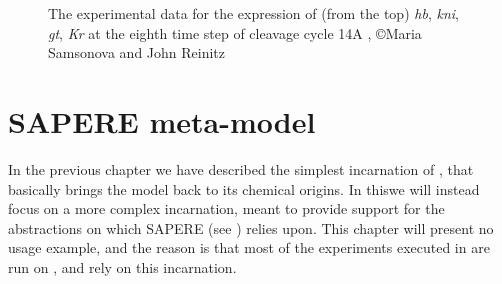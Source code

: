 \documentclass[12pt,a4paper,twoside,openright]{book}
\begin{document}
\begin{figure}
\caption[Drosophila experimental data]{The experimental data for the expression of (from the top) \emph{hb}, \emph{kni}, \emph{gt}, \emph{Kr} at the eighth time step of cleavage cycle 14A  \cite{database-2008}, \copyright Maria Samsonova and John Reinitz}
\label{fig:expdata}
\end{figure}


\chapter{SAPERE meta-model}

In the previous chapter we have described the simplest incarnation of \alchemist{}, that basically brings the model back to its chemical origins.
%
In this\levelText{}we will instead focus on a more complex incarnation, meant to provide support for the abstractions on which SAPERE (see ) relies upon.
%
This chapter will present no usage example, and the reason is that most of the experiments executed in  are run on \alchemist{}, and rely on this incarnation.
\end{document}
